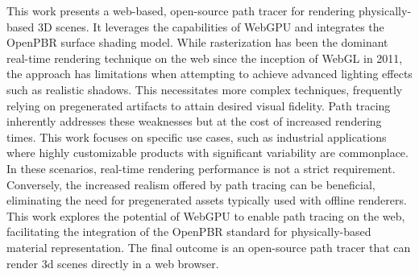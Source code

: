
This work presents a web-based, open-source path tracer for rendering physically-based 3D scenes. It leverages the capabilities of WebGPU and integrates the OpenPBR surface shading model. While rasterization has been the dominant real-time rendering technique on the web since the inception of WebGL in 2011, the approach has limitations when attempting to achieve advanced lighting effects such as realistic shadows. This necessitates more complex techniques, frequently relying on pregenerated artifacts to attain desired visual fidelity. Path tracing inherently addresses these weaknesses but at the cost of increased rendering times. This work focuses on specific use cases, such as industrial applications where highly customizable products with significant variability are commonplace. In these scenarios, real-time rendering performance is not a strict requirement. Conversely, the increased realism offered by path tracing can be beneficial, eliminating the need for pregenerated assets typically used with offline renderers. This work explores the potential of WebGPU to enable path tracing on the web, facilitating the integration of the OpenPBR standard for physically-based material representation. The final outcome is an open-source path tracer that can render 3d scenes directly in a web browser.
